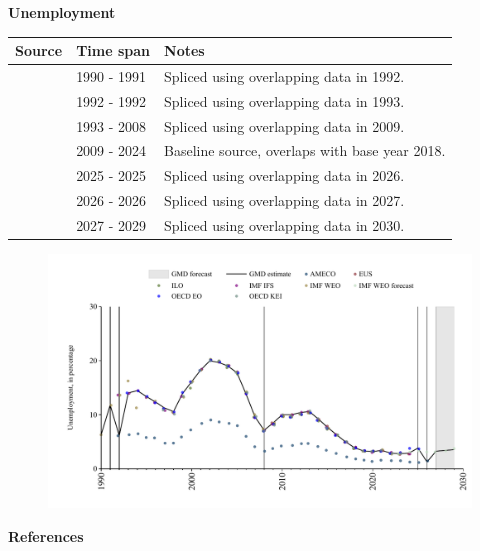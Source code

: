 \documentclass[12pt,a4paper,landscape]{article}
\begin{document}
\begin{adjustbox}{max totalsize={\paperwidth}{\paperheight},center}
\begin{minipage}[t][\textheight][t]{\textwidth}
\vspace*{0.5cm}
{}
\begin{center}
{\Large\bfseries Unemployment}
\end{center}
\vspace{0.5cm}
\begin{table}[H]
\centering
\small
\begin{tabular}{|l|l|l|}
\hline
\textbf{Source} & \textbf{Time span} & \textbf{Notes} \\
\hline
\rowcolor{white}\cite{IMF_WEO}& 1990 - 1991 &Spliced using overlapping data in 1992. \\
\rowcolor{lightgray}\cite{AMECO}& 1992 - 1992 &Spliced using overlapping data in 1993. \\
\rowcolor{white}\cite{OECD_EO}& 1993 - 2008 &Spliced using overlapping data in 2009. \\
\rowcolor{lightgray}\cite{EUS}& 2009 - 2024 &Baseline source, overlaps with base year 2018. \\
\rowcolor{white}\cite{OECD_EO}& 2025 - 2025 &Spliced using overlapping data in 2026. \\
\rowcolor{lightgray}\cite{AMECO}& 2026 - 2026 &Spliced using overlapping data in 2027. \\
\rowcolor{white}\cite{IMF_WEO_forecast}& 2027 - 2029 &Spliced using overlapping data in 2030. \\
\hline
\end{tabular}
\end{table}
\begin{figure}[H]
\centering
\includegraphics[width=\textwidth,height=0.6\textheight,keepaspectratio]{graphs/POL_unemp.pdf}
\end{figure}
\end{minipage}
\end{adjustbox}
{}
\begin{center}
{\Large\bfseries References}
\end{center}
\small


\end{document}
